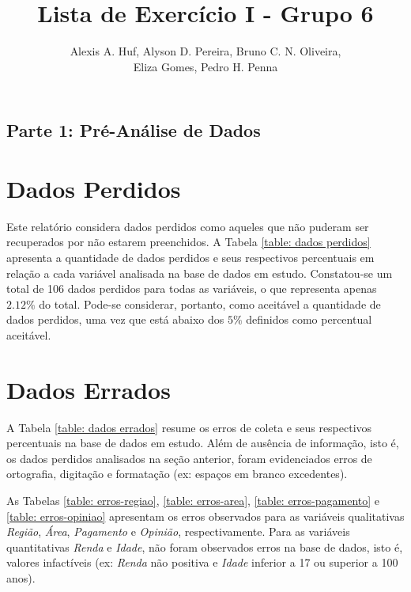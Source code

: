 \documentclass[10pt,a4paper,oneside]{article}
\author{%
	Alexis A. Huf, %
	Alyson D. Pereira, %
	Bruno C. N. Oliveira,\\%
	Eliza Gomes, %
	Pedro H. Penna
	}
\title{Lista de Exercício I - Grupo 6}
\begin{document}
\maketitle

\begin{center}
\section*{Parte 1: Pré-Análise de Dados}
\end{center}

\section{Dados Perdidos}
\label{section:dados-perdidos}

Este relatório considera dados perdidos como aqueles que não puderam ser recuperados por não estarem preenchidos. A Tabela \ref{table: dados perdidos} apresenta a quantidade de dados perdidos e seus respectivos percentuais em relação a cada variável analisada na base de dados em estudo. Constatou-se um total de 106 dados perdidos para todas as variáveis, o que representa apenas $2.12\%$ do total. Pode-se considerar, portanto, como aceitável a quantidade de dados perdidos, uma vez que está abaixo dos $5\%$ definidos como percentual aceitável.

\section{Dados Errados}
\label{section:dados-errados}

A Tabela \ref{table: dados errados} resume os erros de coleta e seus respectivos percentuais na base de dados em estudo. Além de ausência de informação, isto é, os dados perdidos analisados na seção anterior, foram evidenciados erros de ortografia, digitação e formatação (ex: espaços em branco excedentes). 

As Tabelas \ref{table: erros-regiao}, \ref{table: erros-area}, \ref{table: erros-pagamento} e \ref{table: erros-opiniao} apresentam os erros observados para as variáveis qualitativas \textit{Região}, \textit{Área}, \textit{Pagamento} e \textit{Opinião}, respectivamente.
Para as variáveis quantitativas \textit{Renda} e \textit{Idade}, não foram observados erros na base de dados, isto é, valores infactíveis (ex: \textit{Renda} não positiva e \textit{Idade} inferior a 17 ou superior a 100 anos).
\end{document}
